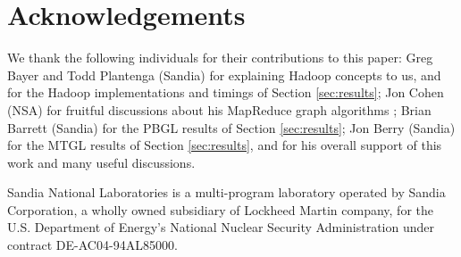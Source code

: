 \section{Acknowledgements}
\label{sec:thanks}

We thank the following individuals for their contributions to this
paper: Greg Bayer and Todd Plantenga (Sandia) for explaining Hadoop
concepts to us, and for the Hadoop implementations and timings of
Section \ref{sec:results}; Jon Cohen (NSA) for fruitful discussions
about his MapReduce graph algorithms \cite{Cohen}; Brian Barrett
(Sandia) for the PBGL results of Section \ref{sec:results}; Jon Berry
(Sandia) for the MTGL results of Section \ref{sec:results}, and for
his overall support of this work and many useful discussions.

Sandia National Laboratories is a multi-program laboratory operated by
Sandia Corporation, a wholly owned subsidiary of Lockheed Martin
company, for the U.S. Department of Energy's National Nuclear Security
Administration under contract DE-AC04-94AL85000.
